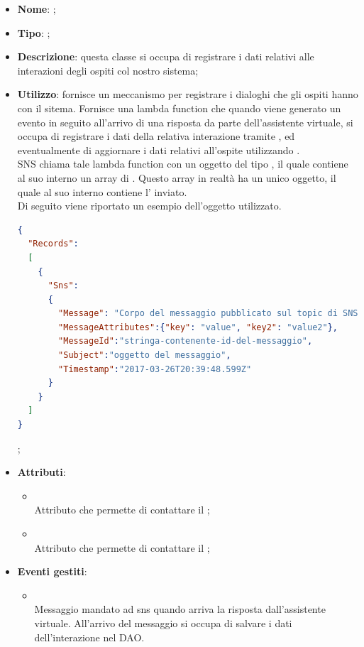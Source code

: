 \begin{itemize}
	\item \textbf{Nome}: ;
	\item \textbf{Tipo}: ;
	\item \textbf{Descrizione}: questa classe si occupa di registrare i dati relativi alle interazioni degli ospiti col nostro sistema;
	\item \textbf{Utilizzo}: fornisce un meccanismo per registrare i dialoghi che gli ospiti hanno con il sitema. Fornisce una lambda function che quando viene generato un evento  in seguito all'arrivo di una risposta da parte dell'assistente virtuale, si occupa di registrare i dati della relativa interazione tramite , ed eventualmente di aggiornare i dati relativi all'ospite utilizzando . \\
SNS chiama tale lambda function con un oggetto del tipo , il quale contiene al suo interno un array di . Questo array in realtà ha un unico oggetto, il quale al suo interno contiene l' inviato. \\
Di seguito viene riportato un esempio dell'oggetto utilizzato.
\begin{lstlisting}[language=json,firstnumber=1]
{
  "Records":
  [
    {
      "Sns":
      {
        "Message": "Corpo del messaggio pubblicato sul topic di SNS",
        "MessageAttributes":{"key": "value", "key2": "value2"},
        "MessageId":"stringa-contenente-id-del-messaggio",
        "Subject":"oggetto del messaggio",
        "Timestamp":"2017-03-26T20:39:48.599Z"
      }
    }
  ]
}
\end{lstlisting};
	\item \textbf{Attributi}:
	\begin{itemize}
		\item[]  \\
		Attributo che permette di contattare il ;
		\item[]  \\
		Attributo che permette di contattare il ;
	\end{itemize}
	\item \textbf{Eventi gestiti}:
	\begin{itemize}
\item {} \\ Messaggio mandato ad sns quando arriva la risposta dall'assistente virtuale. All'arrivo del messaggio si occupa di salvare i dati dell'interazione nel DAO.	\end{itemize}
\end{itemize}

